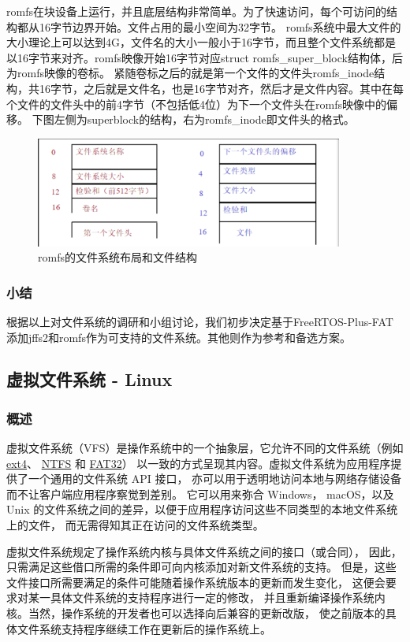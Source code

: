 \documentclass[UTF8,a4paper]{ctexart}
\begin{document}
romfs在块设备上运行，并且底层结构非常简单。为了快速访问，每个可访问的结构都从16字节边界开始。文件占用的最小空间为32字节。
romfs系统中最大文件的大小理论上可以达到4G，文件名的大小一般小于16字节，而且整个文件系统都是以16字节来对齐。romfs映像开始16字节对应struct romfs_super_block结构体，后为romfs映像的卷标。
紧随卷标之后的就是第一个文件的文件头romfs_inode结构，共16字节，之后就是文件名，也是16字节对齐，然后才是文件内容。其中在每个文件的文件头中的前4字节（不包括低4位）为下一个文件头在romfs映像中的偏移。
下图左侧为superblock的结构，右为romfs_inode即文件头的格式。
	\begin{figure}[H]
		\centering
		\includegraphics[width=0.9\textwidth]{romfs.png}
		\caption{romfs的文件系统布局和文件结构}
	\end{figure}
\subsubsection{小结}
根据以上对文件系统的调研和小组讨论，我们初步决定基于FreeRTOS-Plus-FAT添加jffs2和romfs作为可支持的文件系统。其他则作为参考和备选方案。

\subsection{虚拟文件系统 - Linux}
\subsubsection{概述}

虚拟文件系统（VFS）是操作系统中的一个抽象层，它允许不同的文件系统（例如
\href{https://en.wikipedia.org/wiki/Ext4}{ext4}、
\href{https://en.wikipedia.org/wiki/NTFS}{NTFS}
和
\href{https://en.wikipedia.org/wiki/File_Allocation_Table}{FAT32}）
以一致的方式呈现其内容。虚拟文件系统为应用程序提供了一个通用的文件系统
API
接口，
亦可以用于透明地访问本地与网络存储设备而不让客户端应用程序察觉到差别。
它可以用来弥合
Windows， macOS，以及 Unix
的文件系统之间的差异，以便于应用程序访问这些不同类型的本地文件系统上的文件，
而无需得知其正在访问的文件系统类型。

虚拟文件系统规定了操作系统内核与具体文件系统之间的接口（或合同），
因此，只需满足这些借口所需的条件即可向内核添加对新文件系统的支持。
但是，这些文件接口所需要满足的条件可能随着操作系统版本的更新而发生变化，
这便会要求对某一具体文件系统的支持程序进行一定的修改，
并且重新编译操作系统内核。当然，操作系统的开发者也可以选择向后兼容的更新改版，
使之前版本的具体文件系统支持程序继续工作在更新后的操作系统上。
\end{document}

